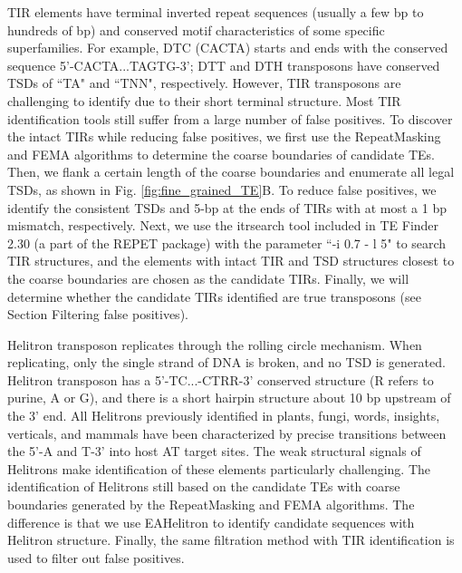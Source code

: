 \documentclass{bmcart}
\begin{document}
TIR elements have terminal inverted repeat sequences (usually a few bp to hundreds of bp) and conserved motif characteristics of some specific superfamilies. For example, DTC (CACTA) starts and ends with the conserved sequence 5'-CACTA...TAGTG-3'; DTT and DTH transposons have conserved TSDs of ``TA" and ``TNN", respectively. However, TIR transposons are challenging to identify due to their short terminal structure. Most TIR identification tools still suffer from a large number of false positives. To discover the intact TIRs while reducing false positives, we first use the RepeatMasking and FEMA algorithms to determine the coarse boundaries of candidate TEs. Then, we flank a certain length of the coarse boundaries and enumerate all legal TSDs, as shown in Fig. \ref{fig:fine_grained_TE}B. To reduce false positives, we identify the consistent TSDs and 5-bp at the ends of TIRs with at most a 1 bp mismatch, respectively. Next, we use the itrsearch tool included in TE Finder 2.30 (a part of the REPET\cite{quesneville2010repet} package) with the parameter ``-i 0.7 - l 5" to search TIR structures, and the elements with intact TIR and TSD structures closest to the coarse boundaries are chosen as the candidate TIRs. Finally, we will determine whether the candidate TIRs identified are true transposons (see Section Filtering false positives). 

Helitron transposon replicates through the rolling circle mechanism. When replicating, only the single strand of DNA is broken, and no TSD is generated. Helitron transposon has a 5'-TC...-CTRR-3' conserved structure (R refers to purine, A or G), and there is a short hairpin structure about 10 bp upstream of the 3' end. All Helitrons previously identified in plants, fungi, words, insights, verticals, and mammals have been characterized by precise transitions between the 5'-A and T-3' into host AT target sites\cite{kapitonov2007helitrons}. The weak structural signals of Helitrons make identification of these elements particularly challenging. The identification of Helitrons still based on the candidate TEs with coarse boundaries generated by the RepeatMasking and FEMA algorithms. The difference is that we use EAHelitron\cite{hu2019helitron} to identify candidate sequences with Helitron structure. Finally, the same filtration method with TIR identification is used to filter out false positives.
\end{document}

